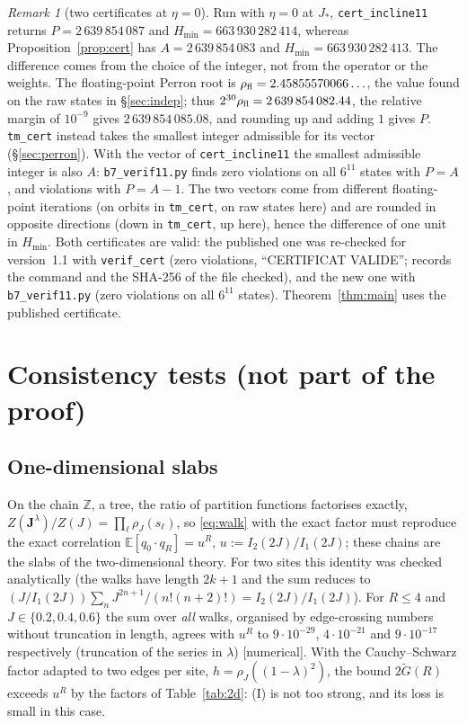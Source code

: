 \documentclass[11pt,a4paper]{article}
\theoremstyle{plain}
\theoremstyle{remark}
\newtheorem{remark}[theorem]{Remark}
\numberwithin{equation}{section}
\newcommand{\Z}{\mathbb{Z}}
\newcommand{\E}{\mathbb{E}}
\newcommand{\Gt}{\widetilde G}
\newcommand{\st}[1]{\textsf{[#1]}}
\newcommand{\bs}{\boldsymbol}
\begin{document}
\begin{remark}[two certificates at $\eta=0$]\label{rem:twocert}
Run with $\eta=0$ at $J_*$, \texttt{cert\_incline11} returns $P=2\,639\,854\,087$ and $H_{\min}=663\,930\,282\,414$, whereas
Proposition~\ref{prop:cert} has $A=2\,639\,854\,083$ and $H_{\min}=663\,930\,282\,413$. The difference comes from the choice of the integer,
not from the operator or the weights. The floating-point Perron root is $\rho_{\rm fl}=2.45855570066\ldots$, the value found on the raw
states in \S\ref{sec:indep}; thus $2^{30}\rho_{\rm fl}=2\,639\,854\,082.44$, the relative margin of $10^{-9}$ gives
$2\,639\,854\,085.08$, and rounding up and adding $1$ gives $P$. \texttt{tm\_cert} instead takes the smallest integer admissible for its
vector (\S\ref{sec:perron}). With the vector of \texttt{cert\_incline11} the smallest admissible integer is also $A$:
\texttt{b7\_verif11.py} finds zero violations on all $6^{11}$ states with $P=A$, and violations with $P=A-1$. The two vectors come from different floating-point iterations (on orbits in \texttt{tm\_cert}, on raw states here) and
are rounded in opposite directions (down in \texttt{tm\_cert}, up here), hence the difference of one unit in $H_{\min}$. Both certificates are
valid: the published one was re-checked for version~1.1 with \texttt{verif\_cert} (zero violations, ``CERTIFICAT VALIDE'';
 records the command and the SHA-256 of the file checked), and the new one
with \texttt{b7\_verif11.py} (zero violations on all $6^{11}$ states). Theorem~\ref{thm:main} uses the published certificate.
\end{remark}

\section{Consistency tests (not part of the proof)}\label{sec:checks}

\subsection{One-dimensional slabs}
On the chain $\Z$, a tree, the ratio of partition functions factorises exactly, $Z(\bs J^\lambda)/Z(J)=\prod_\ell\rho_J(s_\ell)$, so
\eqref{eq:walk} with the exact factor must reproduce the exact correlation $\E[q_0\cdot q_R]=u^R$, $u:=I_2(2J)/I_1(2J)$; these chains
are the slabs of the two-dimensional theory. For two sites this identity was checked analytically (the walks have length $2k+1$ and
the sum reduces to $(J/I_1(2J))\sum_nJ^{2n+1}/(n!(n+2)!)=I_2(2J)/I_1(2J)$). For $R\le4$ and $J\in\{0.2,0.4,0.6\}$ the sum over
\emph{all} walks, organised by edge-crossing numbers without truncation in length, agrees with $u^R$ to $9\cdot10^{-29}$,
$4\cdot10^{-21}$ and $9\cdot10^{-17}$ respectively (truncation of the series in $\lambda$) \st{numerical}. With the Cauchy--Schwarz
factor adapted to two edges per site, $h=\rho_J((1-\lambda)^2)$, the bound $2\Gt(R)$ exceeds $u^R$ by the factors of
Table~\ref{tab:2d}: (I) is not too strong, and its loss is small in this case.
\end{document}
